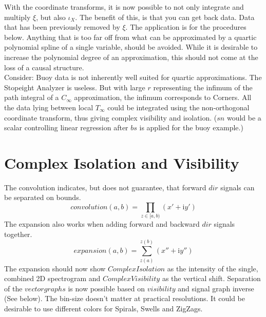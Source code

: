 \documentclass{report}
\begin{document}
With the coordinate transforms, it is now possible to not only integrate and multiply $\xi$, but also $\iota_{X}$. The benefit of this, is that you can get back data. Data that has been previously removed by $\xi$. The application is for the procedures below. Anything that is too far off from what can be approximated by a quartic polynomial spline of a single variable, should be avoided. While it is desirable to increase the polynomial degree of an approximation, this should not come at the loss of a causal structure.\\
Consider: Buoy data is not inherently well suited for quartic approximations. The Stopeight Analyzer is useless. But with large $r$ representing the infimum of the path integral of a $C_{\infty}$ approximation, the infimum corresponds to Corners. All the data lying between local $T_{\infty}$ could be integrated using the non-orthogonal coordinate transform, thus giving complex visibility and isolation. ($sn$ would be a scalar controlling linear regression after $bs$ is applied for the buoy example.)

\section{Complex Isolation and Visibility}
The convolution indicates, but does not guarantee, that forward $dir$ signals can be separated on bounds.
\begin{equation}
convolution(a,b)=\prod \limits _{z \in [a,b)} (x'+\mathrm{i}y')
\end{equation}
The expansion also works when adding forward and backward $dir$ signals together.
\begin{equation}
expansion(a,b)=\sum \limits _{z(a)}^{z(b)} (x''+\mathrm{i}y'')
\end{equation}
The expansion should now show $Complex Isolation$ as the intensity of the single, combined 2D spectrogram and $Complex Visibility$ as the vertical shift. Separation of the $vectorgraphs$ is now possible based on $visibility$ and signal graph inverse (See below). The bin-size doesn't matter at practical resolutions. It could be desirable to use different colors for Spirals, Swells and ZigZags.
\end{document}

